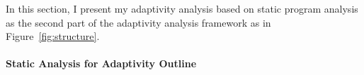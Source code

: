 In this section, I present my 
adaptivity analysis based on static program analysis as the second part of 
the adaptivity analysis framework as in Figure~\ref{fig:structure}. 
% 

% 


\paragraph{{Static Analysis for Adaptivity Outline}}

